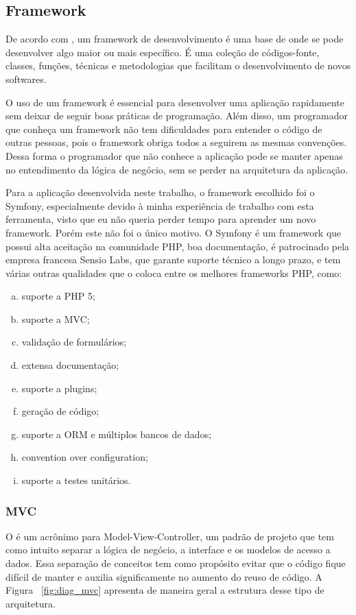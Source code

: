 \subsection{Framework}
De acordo com \cite{Minetto}, um framework de desenvolvimento é uma base de onde se pode desenvolver 
algo maior ou mais específico. É uma coleção de códigos-fonte, classes, funções, técnicas e 
metodologias que facilitam o desenvolvimento de novos softwares.

O uso de um framework é essencial para desenvolver uma aplicação rapidamente sem deixar
de seguir boas práticas de programação. Além disso, um programador que conheça um
framework não tem dificuldades para entender o código de outras pessoas, pois o framework obriga todos 
a seguirem as mesmas convenções. Dessa forma o programador que não conhece a aplicação pode se
manter apenas no entendimento da lógica de negócio, sem se perder na arquitetura da aplicação.

Para a aplicação desenvolvida neste trabalho, o framework escolhido foi o Symfony, especialmente 
devido à minha experiência de trabalho com esta ferramenta, visto que eu não queria perder 
tempo para aprender um novo framework. Porém este não foi o único motivo. O Symfony é um 
framework que possui alta aceitação na comunidade PHP, boa documentação, é patrocinado pela 
empresa francesa Sensio Labs, que garante suporte técnico a longo prazo, e tem várias outras 
qualidades que o coloca entre os melhores frameworks PHP, como:

\begin{enumerate}[a.]
\item suporte a PHP 5;
\item suporte a MVC;
\item validação de formulários;
\item extensa documentação;
\item suporte a plugins;
\item geração de código;
\item suporte a ORM e múltiplos bancos de dados;
\item convention over configuration;
\item suporte a testes unitários.
\end{enumerate}

\subsubsection{MVC}
O  é um acrônimo para Model-View-Controller, um padrão de projeto que tem como intuito
separar a lógica de negócio, a interface e os modelos de acesso a dados. Essa separação
de conceitos tem como propósito evitar que o código fique difícil de manter e auxilia
significamente no aumento do reuso de código. A Figura ~\ref{fig:diag_mvc} apresenta de maneira
geral a estrutura desse tipo de arquitetura.

